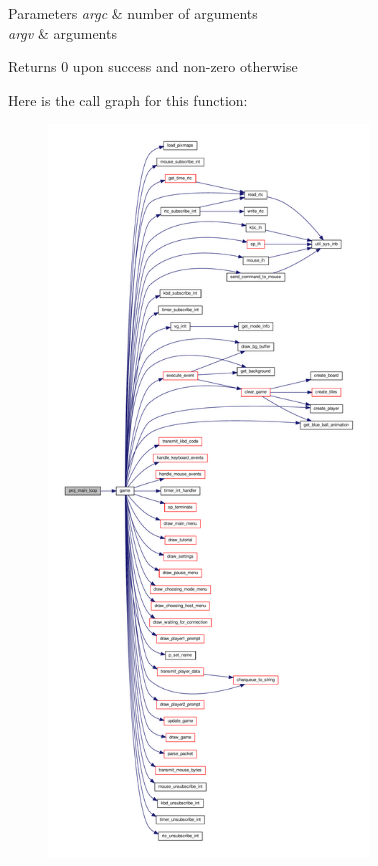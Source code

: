 \begin{DoxyParams}{Parameters}
{\em argc} & number of arguments \\
\hline
{\em argv} & arguments \\
\hline
\end{DoxyParams}
\begin{DoxyReturn}{Returns}
0 upon success and non-\/zero otherwise 
\end{DoxyReturn}
Here is the call graph for this function\+:\nopagebreak
\begin{figure}[H]
\begin{center}
\leavevmode
\includegraphics[height=550pt]{group__Proj_ga2a16f651eccbd248e1ad3b3b924b143b_cgraph}
\end{center}
\end{figure}
